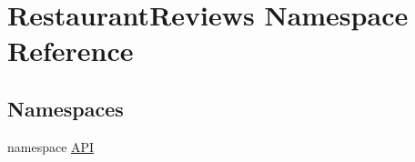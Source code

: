 \hypertarget{namespace_restaurant_reviews}{}\section{Restaurant\+Reviews Namespace Reference}
\label{namespace_restaurant_reviews}
\subsection*{Namespaces}
\begin{DoxyCompactItemize}
\item 
namespace \hyperlink{namespace_restaurant_reviews_1_1_a_p_i}{A\+PI}
\end{DoxyCompactItemize}
